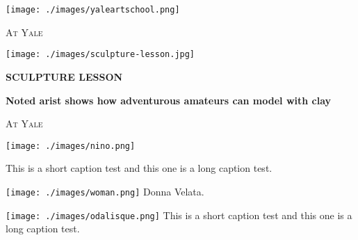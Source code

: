 \begin{minipage}{\textwidth}
\texttt{[image: ./images/yaleartschool.png]}


\end{minipage}
\begin{multicols}{3}
        \lettrine{A}{t Yale}\lorem \lipsum[1-3]
        \par
\end{multicols}

\pagebreak

\begin{minipage}{\textwidth}
\texttt{[image: ./images/sculpture-lesson.jpg]}\par
\vspace{\baselineskip}

\centerline{\HUGE\bfseries SCULPTURE LESSON}
\vspace{0.5\baselineskip}

\centerline{\LARGE\bfseries Noted arist shows how adventurous amateurs can model with clay }

\end{minipage}

{
\columnsep-1.3cm\par\leavevmode

\begin{multicols}{3}
        \lettrine{A}{t Yale} \lorem \lorem \lorem \lorem
        
\end{multicols}
}


\pagebreak





\lipsum[1]
\texttt{[image: ./images/nino.png]}

This is a short caption test and this one is a long caption test.

\texttt{[image: ./images/woman.png]}
Donna Velata.

\clearpage
\raggedbottom

\thispagestyle{plain}
\noindent\texttt{[image: ./images/odalisque.png]} \vskip0pt%
This is a short caption test and this one is a long caption test.

